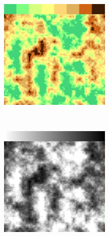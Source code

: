 \begin{figure}
        \centering
        \begin{subfigure}[b]{0.3\textwidth}
                \includegraphics[width=\textwidth]{img/Theory/Perlin_Noise/gradient_discrete.png}
                \label{fig:Ncolors}
        \end{subfigure}%
        ~ %
        \begin{subfigure}[b]{0.3\textwidth}
                \includegraphics[width=\textwidth]{img/Theory/Perlin_Noise/gradient_grey.png}

\end{subfigure}
\end{figure}
